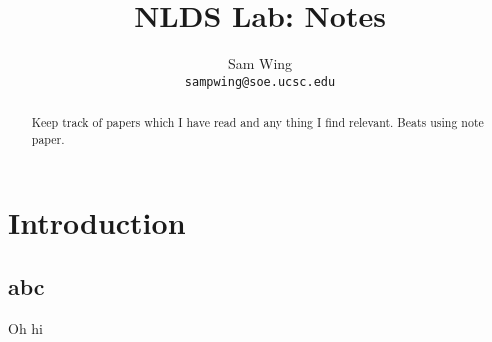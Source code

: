 \documentclass[11pt]{article}
\title{NLDS Lab: Notes}
\author{
	Sam Wing \\
	\texttt{sampwing@soe.ucsc.edu}
}
\date{}                                           %
\begin{document}
\maketitle

\begin{abstract}
Keep track of papers which I have read and any thing I find relevant.  Beats using note paper.
\end{abstract}

\section{Introduction}
\subsection{abc}
Oh hi\cite{icwsm}
\pagebreak


\end{document}
